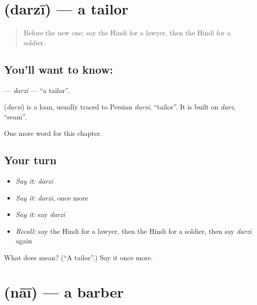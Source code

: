 \section[\texorpdfstring{\hi{दर्ज़ी} (darzī)}{दर्ज़ी (darzī)}]{ (darzī) — a tailor}

\label{lesson:HI-C193-darzi}



\begin{quote}
Before the new one: say the Hindi for a lawyer, then the Hindi for a soldier.
\end{quote}

\subsection*{You'll want to know: }
\textbf{} — \emph{darzī} — \textquotedblleft{}a tailor\textquotedblright{}.

\begin{cousinweb}
\textbf{} (\emph{darzī}) is a loan, usually traced to Persian \emph{darzī}, \textquotedblleft{}tailor\textquotedblright{}. It is built on \emph{darz}, \textquotedblleft{}seam\textquotedblright{}.
\end{cousinweb}

\begin{grammarlens}[title={What you've built}]
One more word for this chapter.
\end{grammarlens}

\subsection*{Your turn}
\begin{itemize}
\raggedright
  \item \emph{Say it:} \emph{darzī}
  \item \emph{Say it:} \emph{darzī}, once more
  \item \emph{Say it:} say \emph{darzī}
  \item \emph{Recall:} say the Hindi for a lawyer, then the Hindi for a soldier, then say \emph{darzī} again
\end{itemize}

\begin{tcolorbox}[breakable,colback=teal!4,colframe=teal!35!black,title={Before you move on}]
What does  mean? (\textquotedblleft{}A tailor\textquotedblright{}.) Say it once more.
\end{tcolorbox}
\section[\texorpdfstring{\hi{नाई} (nāī)}{नाई (nāī)}]{ (nāī) — a barber}

